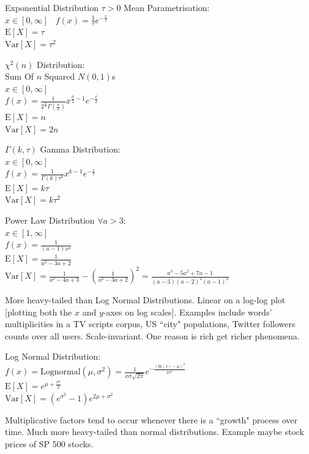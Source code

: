 Exponential Distribution $\tau>0$ Mean Parametrisation: \\
$x \in [0,\infty]$ \
$f(x) = \frac{1}{\tau} e^{-\frac{x}{\tau}}$ \\
$\text{E}[X] = \tau$ \\
$\text{Var}[X] = \tau^2$

$\chi^2 (n)$ Distribution: \\
Sum Of $n$ Squared $N(0,1)$s \\
$x \in [0,\infty]$ \\
$f(x) = \frac{1}{2^{\frac{n}{2}} \Gamma (\frac{n}{2})} x^{\frac{n}{2}-1} e^{-\frac{x}{2}}$ \\
$\text{E}[X]=n$ \\
$\text{Var}[X]=2n$

$\Gamma (k,\tau)$ Gamma Distribution: \\
$x \in [0,\infty]$ \\
$f(x) = \frac{1}{\Gamma (k) \tau^k} x^{k-1} e^{-\frac{x}{\tau}}$ \\
$\text{E}[X]=k\tau$ \\
$\text{Var}[X]=k\tau^2$

Power Law Distribution $\forall a>3$: \\
$x \in [1,\infty]$ \\
$f(x) = \frac{1}{(a - 1)x^{a}}$ \\
$\text{E}[X] = \frac{1}{a^2-3a+2}$ \\
$\text{Var}[X] = \frac{1}{a^2-4a+3}-\left(\frac{1}{a^2-3a+2} \right)^2=\frac{a^3-5a^2+7a-1}{(a-3)(a-2)^2(a-1)^2}$

More heavy-tailed than Log Normal Distributions. Linear on a log-log plot [plotting both the $x$ and $y$-axes on log scales]. Examples include words' multiplicities in a TV scripts corpus, US ``city" populations, Twitter followers counts over all users. Scale-invariant. One reason is rich get richer phenomena.

Log Normal Distribution: \\
$f(x) = \text{Lognormal}(\mu,\sigma^2)=\frac{1}{x\sigma \sqrt{2 \pi}}e^{-\frac{(\text{ln}(x)-\mu)^2}{2 \sigma^2}}$ \\
$\text{E}[X] = e^{\mu + \frac{\sigma^2}{2}}$ \\
$\text{Var}[X] = (e^{\sigma^2}-1)e^{2 \mu+\sigma^2}$

Multiplicative factors tend to occur whenever there is a ``growth" process over time. Much more heavy-tailed than normal distributions. Example maybe stock prices of SP 500 stocks.

